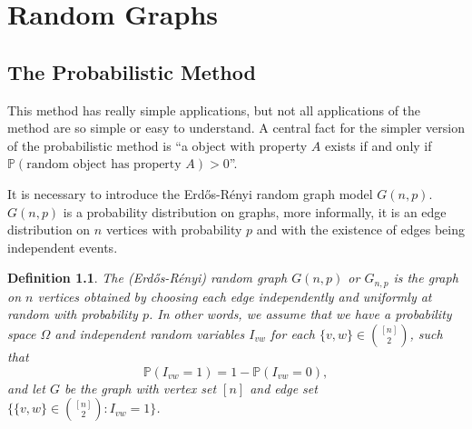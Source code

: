 \documentclass[12pt,twoside,a4paper,bibliography=totocnumbered]{book}
\numberwithin{equation}{section}
\newtheorem{theorem}             {Theorem}[section]
\newtheorem{definition}	[theorem] {Definition}
\theoremstyle{remark}
\begin{document}







\chapter{Random Graphs}
\section{The Probabilistic Method}
This method has really simple applications, but not all applications of the method are so simple or easy to understand. A central fact for the simpler version of the probabilistic method is ``a object with property $ A$ exists if and only if $\mathbb{P}(\text{random object has property }A)>0$''.

It is necessary to introduce the Erd\H{o}s-Rényi random graph model $G(n,p)$. $G(n,p)$ is a probability distribution on graphs, more informally, it is an edge distribution on $n$ vertices with probability $p$ and with the existence of edges being independent events.

\begin{definition}\label{def:randomgraph}
The (Erd\H{o}s-Rényi) random graph $G(n,p)$ or $G_{n,p}$ is the graph on $n$ vertices obtained by choosing each edge independently and uniformly at random with probability $p$. In other words, we assume that we have a probability space $\Omega$ and independent random variables $I_{vw}$ for each $\{v,w\} \in \binom{[n]}{2}$, such that
$$\mathbb{P}(I_{vw} = 1) = 1 - \mathbb{P}(I_{vw} = 0),$$ 
and let $G$ be the graph with vertex set $[n]$ and edge set $\{\{v,w\} \in \binom{[n]}{2}\colon I_{vw} = 1\}$. 

\end{definition}
\end{document}
